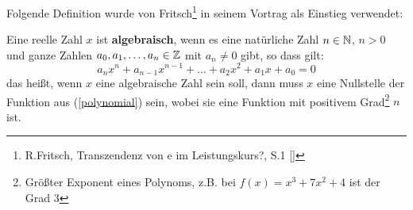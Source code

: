 \documentclass[11pt]{article}
\begin{document}
Folgende Definition wurde von Fritsch\footnote{R.Fritsch, Transzendenz von e im Leistungskurs?, S.1 [\FritschInt]} in seinem Vortrag als Einstieg verwendet:
\begin{definition}\label{def_alge}
    Eine reelle Zahl $x$ ist \textbf{algebraisch}, wenn es eine natürliche Zahl $n \in \mathbb N$, $n >0$ und ganze Zahlen $a_0,a_1,\dots,a_n \in \mathbb Z$ mit $a_n\neq0$ gibt, so dass gilt:
    \begin{equation}\label{polynomial}
        a_nx^n+a_{n-1}x^{n-1}+\dots+a_2x^2+a_1x+a_0=0
    \end{equation}
    das heißt, wenn $x$ eine algebraische Zahl sein soll, dann muss $x$ eine Nullstelle der Funktion aus (\ref{polynomial}) sein, wobei sie eine Funktion mit positivem Grad\footnote{Größter Exponent eines Polynoms, z.B. bei $f(x)=x^3+7x^2+4$ ist der Grad $3$} $n$ ist.
\end{definition}
\end{document}
